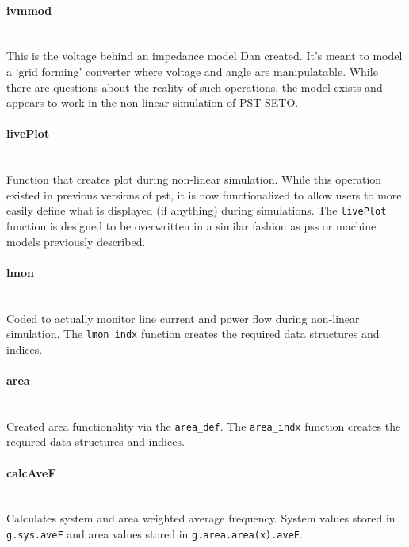 \documentclass[12pt]{article}
\begin{document}
\paragraph{ivmmod} \ \\
This is the voltage behind an impedance model Dan created.
It's meant to model a `grid forming' converter where voltage and angle are manipulatable.
While there are questions about the reality of such operations, the model exists and appears to work in the non-linear simulation  of PST SETO.

\paragraph{livePlot} \ \\
Function that creates plot during non-linear simulation.
While this operation existed in previous versions of pst, it is now functionalized to allow users to more easily define what is displayed (if anything) during simulations.
The \verb|livePlot| function is designed to be overwritten in a similar fashion as pss or machine models previously described.

\paragraph{lmon} \ \\
Coded to actually monitor line current and power flow during non-linear simulation.
The \verb|lmon_indx| function creates the required data structures and indices.
\paragraph{area} \ \\
Created area functionality via the \verb|area_def|.
The \verb|area_indx| function creates the required data structures and indices.

\paragraph{calcAveF} \ \\
Calculates system and area weighted average frequency.
System values stored in \verb|g.sys.aveF| and area values stored in \verb|g.area.area(x).aveF|.
\end{document}
